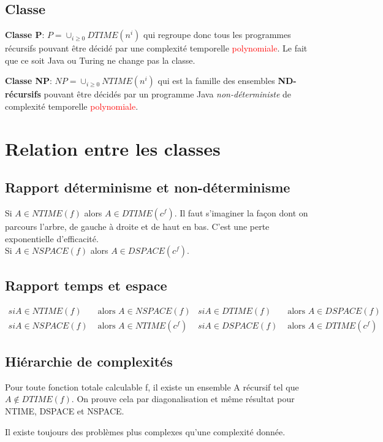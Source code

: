 \documentclass{report}
\begin{document}
\subsection{Classe}
\textbf{Classe P}: $P = \cup_{i \geqslant 0} DTIME(n^i)$ qui regroupe donc tous les programmes récursifs pouvant être décidé par une complexité temporelle \textcolor{red}{polynomiale}. Le fait que ce soit Java ou Turing ne change pas la classe.\par 
\textbf{Classe NP}: $NP = \cup_{i \geqslant 0} NTIME(n^i)$ qui est la famille des ensembles \textbf{ND-récursifs} pouvant être décidés par un programme Java \textit{non-déterministe} de complexité temporelle \textcolor{red}{polynomiale}.

\section{Relation entre les classes}
\subsection{Rapport déterminisme et non-déterminisme}
Si $A \in NTIME(f)$ alors $A \in DTIME(c^f)$. Il faut s'imaginer la façon dont on parcours l'arbre, de gauche à droite et de haut en bas. C'est une perte exponentielle d'efficacité.\\
Si $A \in NSPACE(f)$ alors $A \in DSPACE(c^f)$.

\subsection{Rapport temps et espace}
\begin{align*}
si A \in NTIME(f) &\text{ alors } A \in NSPACE(f) & si A \in DTIME(f) &\text{ alors } A \in DSPACE(f)\\
si A \in NSPACE(f) &\text{ alors } A \in NTIME(c^f) & si A \in DSPACE(f) &\text{ alors } A \in DTIME(c^f)
\end{align*}

\subsection{Hiérarchie de complexités}
Pour toute fonction totale calculable f, il existe un ensemble A récursif tel que $A \notin DTIME(f)$. On prouve cela par diagonalisation et même résultat pour NTIME, DSPACE et NSPACE.\par
Il existe toujours des problèmes plus complexes qu'une complexité donnée.
\end{document}
